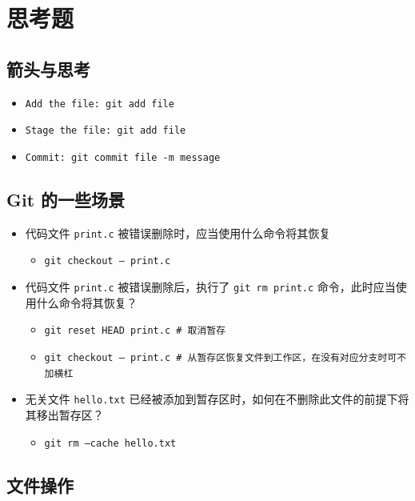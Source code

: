 \section{思考题}

\subsection{箭头与思考}
\begin{itemize}
	\item \texttt{Add the file: git add file}
	\item \texttt{Stage the file: git add file}
	\item \texttt{Commit: git commit file -m message}
\end{itemize}

\subsection{Git 的一些场景}
\begin{itemize}
	\item 代码文件 \texttt{print.c} 被错误删除时，应当使用什么命令将其恢复
	\begin{itemize}
		\item \texttt{git checkout -- print.c}
	\end{itemize}
	\item 代码文件 \texttt{print.c} 被错误删除后，执行了 \texttt{git rm print.c} 命令，此时应当使用什么命令将其恢复？
	\begin{itemize}
		\item \texttt{git reset HEAD print.c \# 取消暂存}
		\item \texttt{git checkout -- print.c \# 从暂存区恢复文件到工作区，在没有对应分支时可不加横杠} 
	\end{itemize}
	\item 无关文件 \texttt{hello.txt} 已经被添加到暂存区时，如何在不删除此文件的前提下将其移出暂存区？
	\begin{itemize}
		\item \texttt{git rm --cache hello.txt}
	\end{itemize}
\end{itemize}

\subsection{文件操作}

\lstset{style=sh}




